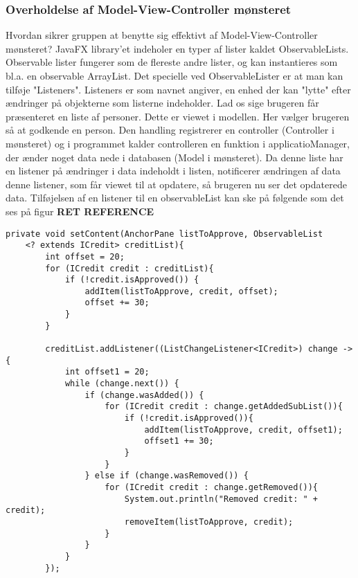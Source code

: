 \subsubsection{Overholdelse af Model-View-Controller mønsteret} Hvordan sikrer gruppen at benytte sig effektivt af Model-View-Controller mønsteret? 
JavaFX library'et indeholer en typer af lister kaldet ObservableLists.
Observable lister fungerer som de flereste andre lister, og kan instantieres som
bl.a. en observable ArrayList. Det specielle ved ObservableLister er at man kan
tilføje "Listeners". Listeners er som navnet angiver, en enhed der kan "lytte"
efter ændringer på objekterne som listerne indeholder. Lad os sige brugeren får
præsenteret en liste af personer. Dette er viewet i modellen. Her vælger
brugeren så at godkende en person. Den handling registrerer en controller
(Controller i mønsteret) og i programmet kalder controlleren en funktion i
applicatioManager, der ænder noget data nede i databasen (Model i mønsteret). Da
denne liste har en listener på ændringer i data indeholdt i listen, notificerer
ændringen af data denne listener, som får viewet til at opdatere, så brugeren nu
ser det opdaterede data.  Tilføjelsen af en listener til en observableList kan
ske på følgende som det ses på figur \textbf{RET REFERENCE}

\begin{lstlisting}[caption = set]
    private void setContent(AnchorPane listToApprove, ObservableList
    <? extends ICredit> creditList){
        int offset = 20;
        for (ICredit credit : creditList){
            if (!credit.isApproved()) {
                addItem(listToApprove, credit, offset);
                offset += 30;
            }
        }

        creditList.addListener((ListChangeListener<ICredit>) change -> {
            int offset1 = 20;
            while (change.next()) {
                if (change.wasAdded()) {
                    for (ICredit credit : change.getAddedSubList()){
                        if (!credit.isApproved()){
                            addItem(listToApprove, credit, offset1);
                            offset1 += 30;
                        }
                    }
                } else if (change.wasRemoved()) {
                    for (ICredit credit : change.getRemoved()){
                        System.out.println("Removed credit: " + credit);
                        removeItem(listToApprove, credit);
                    }
                }
            }
        });
\end{lstlisting}




